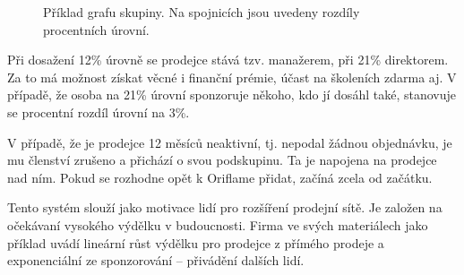 \documentclass[a4wide,12pt]{report}
\begin{document}
\begin{figure}[h]
\begin{center}
\end{center}
\caption{Příklad grafu skupiny. Na spojnicích jsou uvedeny rozdíly procentních úrovní.}
\label{fig:ggraph}
\end{figure}

Při dosažení 12\% úrovně se prodejce stává tzv. manažerem, při 21\% direktorem. Za to má možnost získat věcné i finanční prémie, účast na školeních zdarma aj. V případě, že osoba na 21\% úrovní sponzoruje někoho, kdo jí dosáhl také, stanovuje se procentní rozdíl úrovní na 3\%.

V případě, že je prodejce 12 měsíců neaktivní, tj. nepodal žádnou objednávku, je mu členství zrušeno a přichází o svou podskupinu. Ta je napojena na prodejce nad ním. Pokud se rozhodne opět k Oriflame přidat, začíná zcela od začátku.

Tento systém slouží jako motivace lidí pro rozšíření prodejní sítě. Je založen na očekávaní vysokého výdělku v budoucnosti. Firma ve svých materiálech jako příklad uvádí lineární růst výdělku pro prodejce z přímého prodeje a exponenciální ze sponzorování -- přivádění dalších lidí.
\end{document}
